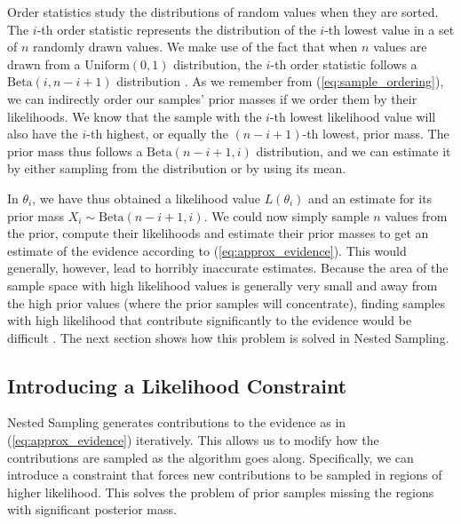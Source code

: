 \documentclass[12pt, a4paper]{report}
\begin{document}
Order statistics study the distributions of random values when they are sorted.
The $i$-th order statistic represents the distribution of the $i$-th lowest value in a set of $n$ randomly drawn values.
We make use of the fact that when $n$ values are drawn from a $\textrm{Uniform}(0,1)$ distribution, the $i$-th order statistic follows a $\textrm{Beta}(i, n-i+1)$ distribution \cite[63]{computational_stats}.
As we remember from (\ref{eq:sample_ordering}), we can indirectly order our samples' prior masses if we order them by their likelihoods.
We know that the sample with the $i$-th lowest likelihood value will also have the $i$-th highest, or equally the $(n-i+1)$-th lowest, prior mass.
The prior mass thus follows a $\textrm{Beta}(n-i+1, i)$ distribution, and we can estimate it by either sampling from the distribution or by using its mean.

In $\theta_{i}$, we have thus obtained a likelihood value $L(\theta_{i})$ and an estimate for its prior mass $X_{i} \sim  \textrm{Beta}(n-i+1, i)$.
We could now simply sample $n$ values from the prior, compute their likelihoods and estimate their prior masses to get an estimate of the evidence according to (\ref{eq:approx_evidence}).
This would generally, however, lead to horribly inaccurate estimates.
Because the area of the sample space with high likelihood values is generally very small and away from the high prior values (where the prior samples will concentrate), finding samples with high likelihood that contribute significantly to the evidence would be difficult \cite[7]{skilling}.
The next section shows how this problem is solved in Nested Sampling.

\subsection{Introducing a Likelihood Constraint} 
Nested Sampling generates contributions to the evidence as in (\ref{eq:approx_evidence}) iteratively.
This allows us to modify how the contributions are sampled as the algorithm goes along.
Specifically, we can introduce a constraint that forces new contributions to be sampled in regions of higher likelihood.
This solves the problem of prior samples missing the regions with significant posterior mass.
\end{document}

